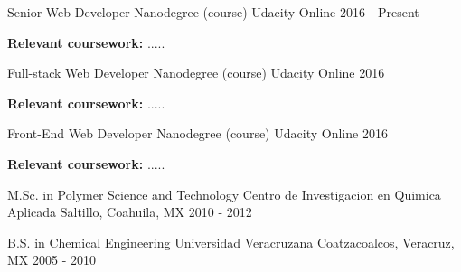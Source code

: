 


\begin{cventries}


\cventry
{Senior Web Developer Nanodegree (course)} %
{Udacity} %
{Online} %
{2016 - Present} %
{ %
	\begin{cvitems}
		\textbf{Relevant coursework:} .....
	\end{cvitems}
}


\cventry
{Full-stack Web Developer Nanodegree (course)} %
{Udacity} %
{Online} %
{2016 } %
{ %
	\begin{cvitems}
		\textbf{Relevant coursework:} .....
	\end{cvitems}
}


\cventry
{Front-End Web Developer Nanodegree (course)} %
{Udacity} %
{Online} %
{2016 } %
{ %
\begin{cvitems}
	\textbf{Relevant coursework:} .....
\end{cvitems}
}


\cventry
{M.Sc. in Polymer Science and Technology} %
{Centro de Investigacion en Quimica Aplicada} %
{Saltillo, Coahuila, MX} %
{2010 - 2012} %
{ %
	\begin{cvitems}
	\end{cvitems}
}


\cventry
{B.S. in Chemical Engineering} %
{Universidad Veracruzana} %
{Coatzacoalcos, Veracruz, MX} %
{2005 - 2010} %
{ %
\begin{cvitems}
\end{cvitems}
}


\end{cventries}